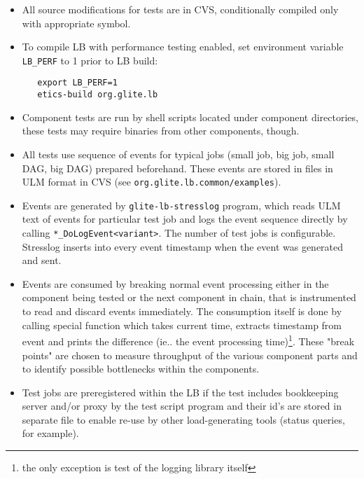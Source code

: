 \begin{itemize}

\item All source modifications for tests are in CVS, conditionally compiled only
with appropriate symbol.

\item To compile LB with performance testing enabled, set environment variable
\verb'LB_PERF' to 1 prior to LB build:
\begin{verbatim}
   export LB_PERF=1
   etics-build org.glite.lb
\end{verbatim}

\item Component tests are run by shell scripts located under component
directories, these tests may require binaries from other components, though.

\item All tests use sequence of events for typical jobs (small job, big job,
small DAG, big DAG) prepared beforehand. These events are stored in files in
ULM format in CVS (see \texttt{org.glite.lb.common/examples}).

\item Events are generated by \verb'glite-lb-stresslog' program, which reads
ULM text of events for particular test job and logs the event sequence directly
by calling \verb'*_DoLogEvent<variant>'. The number of test jobs is
configurable. Stresslog inserts into every event timestamp when the event was
generated and sent.

\item Events are consumed by breaking normal event processing either in the
component being tested or the next component in chain, that is instrumented to
read and discard events immediately. The consumption itself is done by calling
special function which takes current time, extracts timestamp from event and
prints the difference (ie.. the event processing time)\footnote{the only
exception is test of the logging library itself}. These "break points" are
chosen to measure throughput of the various component parts and to identify
possible bottlenecks within the components.

\item Test jobs are preregistered within the LB if the test includes
bookkeeping server and/or proxy by the test script program and their id's are
stored in separate file to enable re-use by other load-generating tools (status
queries, for example).


\end{itemize}
